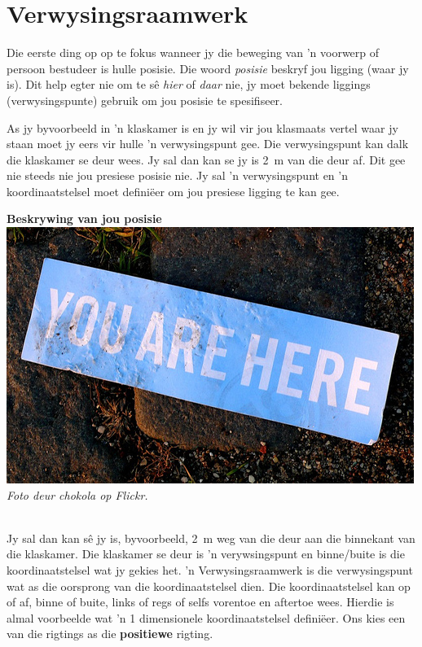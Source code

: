 

\section{Verwysingsraamwerk}
Die eerste ding op op te fokus wanneer jy die beweging van  'n voorwerp of persoon bestudeer is hulle posisie. Die woord \textsl{posisie} beskryf jou ligging (waar jy is). Dit help egter nie om te s\^e \textsl{hier} of \textsl{daar} nie, jy moet bekende liggings (verwysingspunte) gebruik om jou posisie te spesifiseer.

\begin{minipage}{.35\textwidth}
As jy byvoorbeeld in  'n klaskamer is en jy wil vir jou klasmaats vertel waar jy staan moet jy eers vir hulle  'n verwysingspunt gee. Die verwysingspunt kan dalk die klaskamer se deur wees. Jy sal dan kan se jy is 2~m van die deur af. Dit gee nie steeds nie jou presiese posisie nie. Jy sal  'n verwysingspunt en  'n koordinaatstelsel moet defini\"eer om jou presiese ligging te kan gee.
\end{minipage}
\begin{minipage}{.6\textwidth}
\begin{center}
\textbf{Beskrywing van jou posisie}\\
 \includegraphics[width=.8\textwidth]{photos/youarehereby_chokola_flickr.jpg}\\
\textit{Foto deur chokola op Flickr.}
\end{center}
\end{minipage}\\
Jy sal dan kan s\^e jy is, byvoorbeeld, 2~m weg van die deur aan die binnekant van die klaskamer. Die klaskamer se deur is  'n verywsingspunt en binne/buite is die koordinaatstelsel wat jy gekies het.  'n Verwysingsraamwerk is die verwysingspunt wat as die oorsprong van die koordinaatstelsel dien. Die koordinaatstelsel kan op of af, binne of buite, links of regs of selfs vorentoe en aftertoe wees. Hierdie is almal voorbeelde wat  'n 1 dimensionele koordinaatstelsel defini\"eer. Ons kies een van die rigtings as die \textbf{positiewe} rigting.

